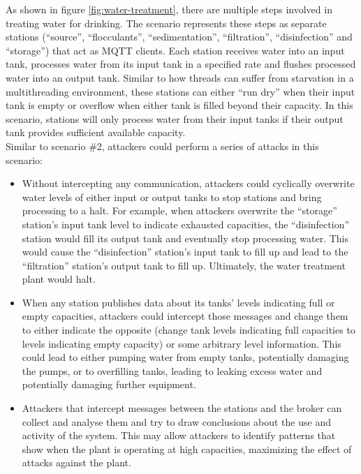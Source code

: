 As shown in figure \ref{fig:water-treatment}, there are multiple steps involved in treating water for drinking. The scenario represents these steps as separate stations (\enquote{source}, \enquote{flocculants}, \enquote{sedimentation}, \enquote{filtration}, \enquote{disinfection} and \enquote{storage}) that act as \ac{MQTT} clients. Each station receives water into an input tank, processes water from its input tank in a specified rate and flushes processed water into an output tank. Similar to how threads can suffer from starvation in a multithreading environment, these stations can either \enquote{run dry} when their input tank is empty or overflow when either tank is filled beyond their capacity. In this scenario, stations will only process water from their input tanks if their output tank provides sufficient available capacity.\\
Similar to scenario \#2, attackers could perform a series of attacks in this scenario:
\begin{itemize}
    \item Without intercepting any communication, attackers could cyclically overwrite water levels of either input or output tanks to stop stations and bring processing to a halt. For example, when attackers overwrite the \enquote{storage} station's input tank level to indicate exhausted capacities, the \enquote{disinfection} station would fill its output tank and eventually stop processing water. This would cause the \enquote{disinfection} station's input tank to fill up and lead to the \enquote{filtration} station's output tank to fill up. Ultimately, the water treatment plant would halt.
    \item When any station publishes data about its tanks' levels indicating full or empty capacities, attackers could intercept those messages and change them to either indicate the opposite (change tank levels indicating full capacities to levels indicating empty capacity) or some arbitrary level information. This could lead to either pumping water from empty tanks, potentially damaging the pumps, or to overfilling tanks, leading to leaking excess water and potentially damaging further equipment.
    \item Attackers that intercept messages between the stations and the broker can collect and analyse them and try to draw conclusions about the use and activity of the system. This may allow attackers to identify patterns that show when the plant is operating at high capacities, maximizing the effect of attacks against the plant.
\end{itemize}
